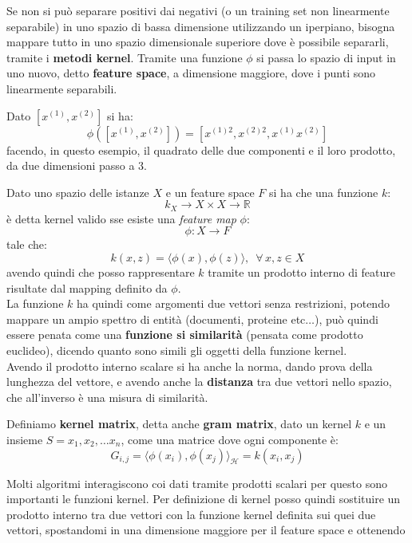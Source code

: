 \documentclass[a4paper,12pt, oneside]{book}
\begin{document}
Se non si può separare positivi dai negativi (o un training set non linearmente
separabile) in uno spazio di bassa dimensione
utilizzando un iperpiano, bisogna mappare tutto in uno spazio dimensionale
superiore dove è possibile separarli, tramite i \textbf{metodi kernel}. Tramite
una funzione $\phi$ si passa lo spazio di input in uno nuovo, detto
\textbf{feature space}, a dimensione maggiore, dove i punti sono linearmente
separabili.  
\begin{esempio}
  Dato $[x^{(1)},x^{(2)}]$ si ha:
  \[\phi([x^{(1)},x^{(2)}])=[x^{(1)2},x^{(2)2},x^{(1)}x^{(2)}]\]
  facendo, in questo esempio, il quadrato delle due componenti e il loro
  prodotto, da due dimensioni passo a 3.
\end{esempio}
\begin{definizione}
  Dato uno spazio delle istanze $X$ e un feature space $F$ si ha che una
  funzione $k$:
  \[k_X\to X\times X\to\mathbb{R}\]
  è detta kernel valido sse esiste una \textit{feature map} $\phi$:
  \[\phi:X\to F\]
  tale che:
  \[k(x,z)=\langle\phi(x),\phi(z)\rangle,\,\,\,\forall\,x,z\in X\]
  avendo quindi che posso rappresentare $k$ tramite un prodotto interno di
  feature risultate dal mapping definito da $\phi$.\\
  La funzione $k$ ha quindi come argomenti due vettori senza restrizioni,
  potendo mappare un ampio spettro di entità (documenti, proteine etc$\ldots$),
  può quindi essere penata come una \textbf{funzione si similarità} (pensata
  come prodotto euclideo), dicendo
  quanto sono simili gli oggetti della funzione kernel.\\
  Avendo il prodotto interno scalare si ha anche la norma, dando prova della
  lunghezza del vettore, e avendo anche la \textbf{distanza} tra due vettori
  nello spazio, che all'inverso è una misura di similarità.
\end{definizione}
\begin{definizione}
  Definiamo \textbf{kernel matrix}, detta anche \textbf{gram matrix}, dato un
  kernel $k$ e un insieme 
  $S=x_1,x_2,\ldots x_n$, come una matrice dove ogni componente è:
  \[G_{i,j}=\langle\phi(x_i),\phi(x_j)\rangle_{\mathcal{H}}=k(x_i,x_j)\]
\end{definizione}
Molti algoritmi interagiscono coi dati tramite prodotti scalari per questo sono
importanti le funzioni kernel. Per definizione di kernel posso quindi sostituire
un prodotto interno tra due vettori con la funzione kernel definita sui quei due
vettori, spostandomi in una dimensione maggiore per il feature space e ottenendo
\end{document}
